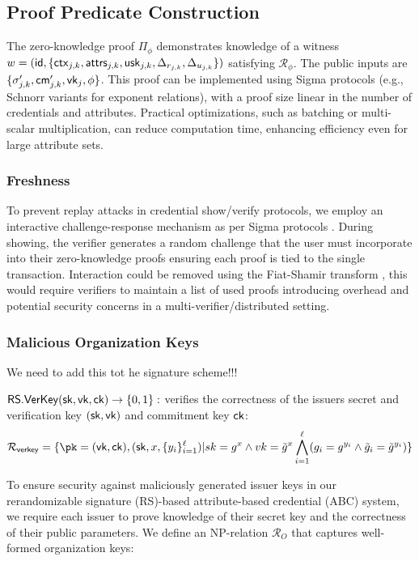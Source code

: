 \subsection{Proof Predicate Construction}

The zero-knowledge proof $\Pi_\phi$ demonstrates knowledge of a witness $w = (\mathsf{id}, \{\mathsf{ctx}_{j,k}, \mathsf{attrs}_{j,k}, \mathsf{usk}_{j,k}, \Delta_{r_{j,k}}, \Delta_{u_{j,k}}\})$ satisfying $\mathcal{R}_\phi$. The public inputs are $\{\sigma_{j,k}', \mathsf{cm}_{j,k}', \mathsf{vk}_j, \phi\}$. This proof can be implemented using Sigma protocols (e.g., Schnorr variants for exponent relations), with a proof size linear in the number of credentials and attributes. Practical optimizations, such as batching or multi-scalar multiplication, can reduce computation time, enhancing efficiency even for large attribute sets.

\subsubsection{Freshness}
To prevent replay attacks in credential show/verify protocols, we employ an interactive challenge-response mechanism as per Sigma protocols \cite{desmedt_proofs_1994, damgard_sigma_2010}. During showing, the verifier generates a random challenge that the user must incorporate into their zero-knowledge proofs ensuring each proof is tied to the single transaction. Interaction could be removed using the Fiat-Shamir transform \cite{odlyzko_how_1986}, this would require verifiers to maintain a list of used proofs introducing overhead and potential security concerns in a multi-verifier/distributed setting.


\subsubsection{Malicious Organization Keys}

We need to add this tot he signature scheme!!!

  \item $\mathsf{RS.VerKey}(\mathsf{sk}, \mathsf{vk}, \mathsf{ck}) \to \{0,1\}:$ verifies the correctness of the issuers secret and verification key $(\mathsf{sk}, \mathsf{vk})$ and commitment key $\mathsf{ck}$:
        \[
        \mathcal{R}_{\mathsf{verkey}} = \{\pk = (\vk, \ck),(\sk, x, \{y_i\}_{i=1}^\ell) | sk = g^x \wedge vk = \tilde{g}^x \bigwedge_{i=1}^\ell (g_i = g^{y_i} \wedge \tilde{g}_i = \tilde{g}^{y_i})\}
        \]
        

To ensure security against maliciously generated issuer keys in our rerandomizable signature (RS)-based attribute-based credential (ABC) system, we require each issuer to prove knowledge of their secret key and the correctness of their public parameters. We define an NP-relation $\mathcal{R}_O$ that captures well-formed organization keys:

